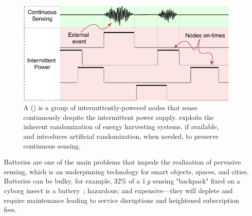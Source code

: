 \begin{figure}[t]
	\centering
	\includegraphics[width=\columnwidth]{figures/coalInterSen}
	\caption{A \fullsys (\sys) is a group of intermittently-powered nodes that sense continuously despite the intermittent power supply. \sys exploits the inherent randomization of energy harvesting systems, if available, and introduces artificial randomization, when needed, to preserve continuous sensing.}
	\label{fig:powerCycle}
\end{figure}
%



Batteries are one of the main problems that impede the realization of pervasive sensing, which is an underpinning technology for smart objects, spaces, and cities. 
Batteries can be bulky, for example, 32\% of a $\SI{1}{g}$ sensing "backpack" fixed on a cyborg insect is a battery~\cite{daly2010pulsed}; hazardous; and expensive---they will deplete and require maintenance leading to service disruptions and heightened subscription fees. 

